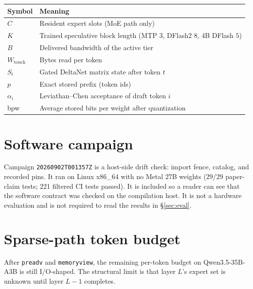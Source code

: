 \documentclass[11pt]{article}
\theoremstyle{definition}
\begin{document}
\begin{center}
\small
\begin{tabular}{@{}ll@{}}
\toprule
Symbol & Meaning \\
\midrule
$C$ & Resident expert slots (MoE path only) \\
$K$ & Trained speculative block length (MTP $3$, DFlash2 $8$, 4B DFlash $5$) \\
$B$ & Delivered bandwidth of the active tier \\
$W_{\mathrm{touch}}$ & Bytes read per token \\
$S_t$ & Gated DeltaNet matrix state after token $t$ \\
$p$ & Exact stored prefix (token ids) \\
$\alpha_i$ & Leviathan--Chen acceptance of draft token $i$ \\
bpw & Average stored bits per weight after quantization \\
\bottomrule
\end{tabular}
\end{center}

\section{Software campaign}
\label{app:campaign}

Campaign \texttt{20260902T001357Z} is a host-side drift check: import fence, catalog, and recorded pins. It ran on Linux x86\_64 with no Metal 27B weights (29/29 paper-claim tests; 221 filtered CI tests passed). It is included so a reader can see that the software contract was checked on the compilation host. It is not a hardware evaluation and is not required to read the results in \S\ref{sec:eval}.

\section{Sparse-path token budget}
\label{app:budget}

After \texttt{preadv} and \texttt{memoryview}, the remaining per-token budget on Qwen3.5-35B-A3B is still I/O-shaped. The structural limit is that layer $L$'s expert set is unknown until layer $L{-}1$ completes.
\end{document}
